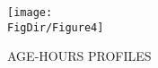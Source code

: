 \hypertarget{AgeHoursProfiles}{}
\begin{figure}[tbp]
  \centerline{\texttt{[image: \\FigDir/Figure4]}}
  \caption{AGE-HOURS PROFILES}
  \label{fig:AgeHoursProfiles}
\end{figure}
